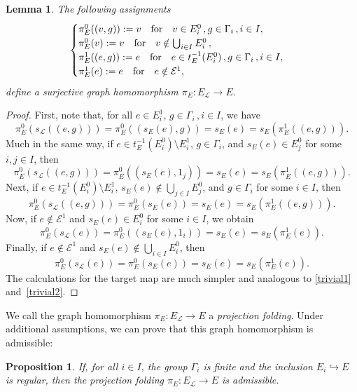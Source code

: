 \documentclass[12pt,times,a4paper]{amsart}
\newtheorem{proposition}[theorem]{Proposition}
\newtheorem{lemma}[theorem]{Lemma}
\numberwithin{equation}{section}
\def\text{\hbox}
\numberwithin{equation}{section}
\begin{document}
 \begin{lemma}
 The following assignments
 \[
 \begin{cases}
 \pi^0_E((v,g)):=v\quad\text{for}\quad v\in E^0_i\,, g\in\Gamma_i\,, i\in I,\\
 \pi^0_E(v):=v\quad\text{for}\quad v\notin \bigcup_{i\in I}E_i^0\,,\\
 \pi^1_E((e,g)):=e\quad\text{for}\quad e\in t_E^{-1}(E^0_i)\,, g\in\Gamma_i\,, i\in I,\\
 \pi^1_E(e):=e\quad\text{for}\quad e\notin\mathcal{E}^1,
 \end{cases}
 \]
 define a surjective graph homomorphism $\pi_E:E_\mathcal{L}\to E$.
 \end{lemma}
 \begin{proof}
 First, note that, for all $e\in E^1_i$, $g\in\Gamma_i\,, i\in I$, we have
 \begin{equation}\label{trivial1}
 \pi^0_E(s_\mathcal{L}((e,g)))=\pi^0_E((s_E(e),g))=s_E(e)=s_E(\pi^1_E((e,g))).
\end{equation}
Much in the same way, if $e\in t_E^{-1}(E^0_i)\setminus E^1_i$, $g\in\Gamma_i$, and $s_E(e)\in E^0_j$ for some $i,j\in I$, then
\begin{equation}
 \pi^0_E(s_\mathcal{L}((e,g)))=\pi^0_E((s_E(e),1_j))=s_E(e)=s_E(\pi^1_E((e,g))).
\end{equation}
Next, if $e\in  t_E^{-1}(E^0_i)\setminus E^1_i$, $s_E(e)\not\in \bigcup_{j\in I}E^0_j$, and $g\in\Gamma_i$ for some $i\in I$, then
\begin{equation}
\pi^0_E(s_\mathcal{L}((e,g)))=\pi^0_E(s_E(e))=s_E(e)=s_E(\pi^1_E((e,g))).
\end{equation}
Now, if $e\not\in\mathcal{E}^1$ and $s_E(e)\in E^0_i$ for some $i\in I$, we obtain 
\begin{equation}
\pi^0_E(s_\mathcal{L}(e))=\pi^0_E((s_E(e),1_i))=s_E(e)=s_E(\pi^1_E(e)).
\end{equation}
Finally, if $e\not\in\mathcal{E}^1$ and $s_E(e)\not\in \bigcup_{i\in I}E^0_i$, 
then 
\begin{equation}\label{trivial2}
\pi^0_E(s_\mathcal{L}(e))=\pi^0_E(s_E(e))=s_E(e)=s_E(\pi^1_E(e)).
\end{equation}
The calculations for the target map are much simpler and analogous to \eqref{trivial1} and~\eqref{trivial2}.
 \end{proof}
We call the graph homomorphism $\pi_E:E_\mathcal{L}\to E$ a \emph{projection folding}. Under additional assumptions, we can prove that 
this graph homomorphism is admissible:
 \begin{proposition}\label{derprop}
If, for all $i\in I$, the group $\Gamma_i$ is finite and the inclusion $E_i\hookrightarrow E$ is regular, then the   projection 
folding $\pi_E\colon E_\mathcal{L}\to E$ is admissible.
 \end{proposition}
\end{document}
